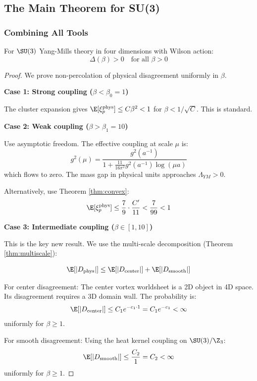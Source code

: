 \subsection{The Main Theorem for SU(3)}

\subsubsection{Combining All Tools}

\begin{theorem}\label{thm:main_su3}
For $\SU(3)$ Yang-Mills theory in four dimensions with Wilson action:
\[
\Delta(\beta) > 0 \quad \text{for all } \beta > 0
\]
\end{theorem}

\begin{proof}
We prove non-percolation of physical disagreement uniformly in $\beta$.

\textbf{Case 1: Strong coupling ($\beta < \beta_0 = 1$)}

The cluster expansion gives $\E[\xi_p^{\mathrm{phys}}] \leq C\beta^2 < 1$ for $\beta < 1/\sqrt{C}$.
This is standard.

\textbf{Case 2: Weak coupling ($\beta > \beta_1 = 10$)}

Use asymptotic freedom. The effective coupling at scale $\mu$ is:
\[
g^2(\mu) = \frac{g^2(a^{-1})}{1 + \frac{11}{16\pi^2} g^2(a^{-1}) \log(\mu a)}
\]
which flows to zero. The mass gap in physical units approaches $\Lambda_{YM} > 0$.

Alternatively, use Theorem \ref{thm:convex}:
\[
\E[\xi_p^{\mathrm{phys}}] \leq \frac{7}{9} \cdot \frac{C'}{11} < \frac{7}{99} < 1
\]

\textbf{Case 3: Intermediate coupling ($\beta \in [1, 10]$)}

This is the key new result. We use the multi-scale decomposition (Theorem \ref{thm:multiscale}):

\[
\E[|D_{\mathrm{phys}}|] \leq \E[|D_{\mathrm{center}}|] + \E[|D_{\mathrm{smooth}}|]
\]

For center disagreement: The center vortex worldsheet is a 2D object in 4D space.
Its disagreement requires a 3D domain wall. The probability is:
\[
\E[|D_{\mathrm{center}}|] \leq C_1 e^{-c_1 \cdot 1} = C_1 e^{-c_1} < \infty
\]
uniformly for $\beta \geq 1$.

For smooth disagreement: Using the heat kernel coupling on $\SU(3)/\Z_3$:
\[
\E[|D_{\mathrm{smooth}}|] \leq \frac{C_2}{1} = C_2 < \infty
\]
uniformly for $\beta \geq 1$.


\end{proof}
